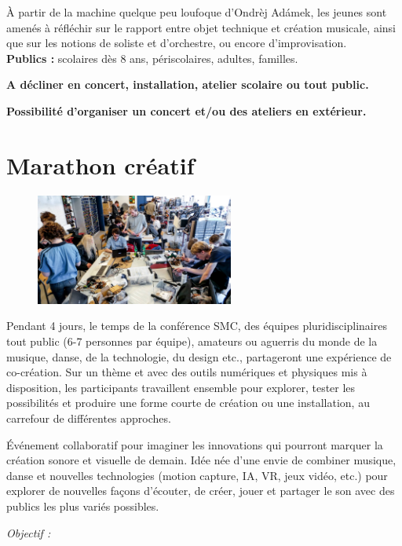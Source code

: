 \documentclass[fontsize=12pt]{scrartcl} %
\numberwithin{equation}{section} %
\numberwithin{table}{section} %
\begin{document}
À partir de la machine quelque peu loufoque d'Ondrèj Adámek, les jeunes sont amenés à réfléchir sur le rapport entre objet technique et création musicale, ainsi que sur les notions de soliste et d'orchestre, ou encore d'improvisation.\\

\noindent
\textbf{Publics :} scolaires dès 8 ans, périscolaires, adultes, familles.

\noindent
\textbf{A décliner en concert, installation, atelier scolaire ou tout public.}

\noindent
\textbf{Possibilité d'organiser un concert et/ou des ateliers en extérieur.}

\pagebreak

\section{Marathon créatif}
\label{app:marathon}

\begin{figure}
\centering
\includegraphics[width=6.5cm]{img/marathon}
\label{fig:marathon}
\end{figure}

Pendant 4 jours, le temps de la conférence SMC, des équipes pluridisciplinaires tout public (6-7 personnes par équipe), amateurs ou aguerris du monde de la musique, danse, de la technologie, du design etc., partageront une expérience de co-création. Sur un thème et avec des outils numériques et physiques mis à disposition, les participants travaillent ensemble pour explorer, tester les possibilités et produire une forme courte de création ou une installation, au carrefour de différentes approches.

Événement collaboratif pour imaginer les innovations qui pourront marquer la création sonore et visuelle de demain. Idée née d'une envie de combiner musique, danse et nouvelles technologies (motion capture, IA, VR, jeux vidéo, etc.) pour explorer de nouvelles façons d'écouter, de créer, jouer  et partager le son  avec des publics les plus variés possibles.

\textit{Objectif :}
\end{document}
